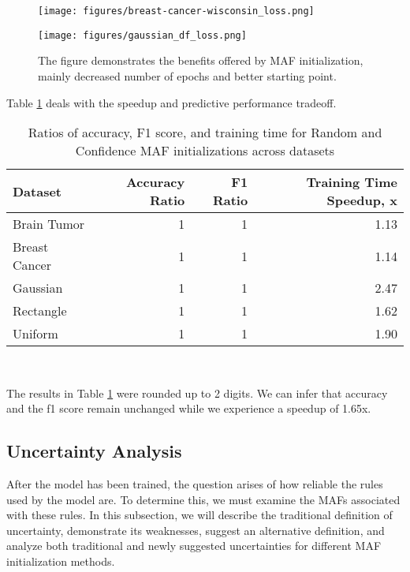 \documentclass[10pt,a4paper,oneside]{article}
\begin{document}
\FloatBarrier

\begin{figure}[htbp]
    \centering
    \label{talbe-ratios}
    \begin{minipage}{0.49\textwidth}
        \texttt{[image: figures/breast-cancer-wisconsin\_loss.png]} %
    \end{minipage}\hfill
    \begin{minipage}{0.49\textwidth}
        \texttt{[image: figures/gaussian\_df\_loss.png]} %
    \end{minipage}
    \caption{The figure demonstrates the benefits offered by MAF initialization, mainly decreased number of epochs and better starting point.}
    \label{fig:side_by_side}
\end{figure}

\newpage
Table \ref{table-ratios} deals with the speedup and predictive performance tradeoff. \\

\begin{table}[htbp]
    \centering
    \caption{Ratios of accuracy, F1 score, and training time for Random and Confidence MAF initializations across datasets}
    \label{table-ratios}
    \begin{tabular}{l|r|r|r}
    \toprule
    Dataset & Accuracy Ratio & F1 Ratio & Training Time Speedup, x \\
    \midrule
Brain Tumor & 1 & 1 & 1.13 \\
Breast Cancer & 1 & 1 & 1.14 \\
Gaussian & 1 & 1 & 2.47 \\
Rectangle & 1 & 1 & 1.62 \\
Uniform & 1 & 1 & 1.90 \\
    \bottomrule
    \end{tabular} \\
\end{table}

The results in Table \ref{table-ratios} were rounded up to 2 digits. We can infer that accuracy and the f1 score remain unchanged while we experience a speedup of 1.65x.


\subsection{Uncertainty Analysis}\label{sec:uncertainty-analysis}
After the model has been trained, the question arises of how reliable the rules used by the model are. To determine this, we must examine the MAFs associated with these rules. In this subsection, we will describe the traditional definition of uncertainty, demonstrate its weaknesses, suggest an alternative definition, and analyze both traditional and newly suggested uncertainties for different MAF initialization methods.
\end{document}
